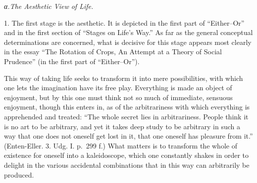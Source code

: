 \documentclass[12pt,a4paper]{book}
\begin{document}
\begin{center}\textit{α.\enspace The Aesthetic View of Life.}\end{center}

1. The first stage is the aesthetic. It is depicted in the first part of
``Either--Or'' and in the first section of ``Stages on Life's Way.'' As
far as the general conceptual determinations are concerned, what is
decisive for this stage appears most clearly in the essay ``The Rotation
of Crops, An Attempt at a Theory of Social Prudence'' (in the first part
of ``Either--Or'').

This way of taking life seeks to transform it into mere possibilities,
with which one lets the imagination have its free play. Everything is made
an object of enjoyment, but by this one must think not so much of
immediate, sensuous enjoyment, though this enters in, as of the
arbitrariness with which everything is apprehended and treated: ``The whole
secret lies in arbitrariness. People think it is no art to be arbitrary,
and yet it takes deep study to be arbitrary in such a way that one does
not oneself get lost in it, that one oneself has pleasure from it.''
(Enten-Eller. 3. Udg. I. p.~299 f.) What matters is to transform the whole
of existence for oneself into a kaleidoscope, which one constantly shakes
in order to delight in the various accidental combinations that in this
way can arbitrarily be produced.
\end{document}
